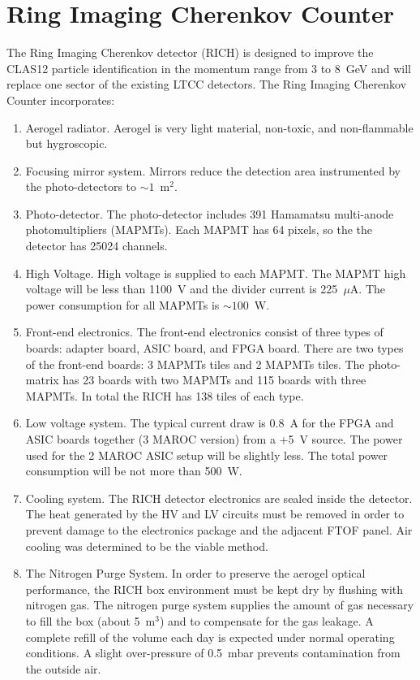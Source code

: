 \section{Ring Imaging Cherenkov Counter}

The Ring Imaging Cherenkov detector (RICH) is designed to improve the CLAS12 particle 
identification in the momentum range from 3 to 8~GeV and will replace one sector of the 
existing LTCC detectors. The Ring Imaging Cherenkov Counter incorporates:

\begin{enumerate}
\item Aerogel radiator. Aerogel is very light material, non-toxic, and non-flammable but 
hygroscopic.

\item Focusing mirror system. Mirrors reduce the detection area instrumented by the 
photo-detectors to $\sim 1$~m$^2$.

\item Photo-detector. The photo-detector includes 391 Hamamatsu multi-anode photomultipliers 
(MAPMTs). Each MAPMT has 64 pixels, so the the detector has 25024 channels.

\item High Voltage. High voltage is supplied to each MAPMT. The MAPMT high voltage will be less 
than 1100~V and the divider current is 225~$\mu$A. The power consumption for all MAPMTs is 
$\sim 100$~W.

\item Front-end electronics. The front-end electronics consist of three types of boards: adapter 
board, ASIC board, and FPGA board.  There are two types of the front-end boards: 3 MAPMTs tiles 
and 2 MAPMTs tiles. The photo-matrix has 23 boards with two MAPMTs and 115 boards with three MAPMTs. 
In total the RICH has 138 tiles of each type.

\item Low voltage system. The typical current draw is 0.8~A for the FPGA and ASIC boards together 
(3 MAROC version) from a +5~V source. The power used for the 2 MAROC ASIC setup will be slightly 
less. The total power consumption will be not more than 500~W. 
 
 \item Cooling system. The RICH detector electronics are sealed inside the detector. The heat 
generated by the HV and LV circuits must be removed in order to prevent damage to the electronics 
package and the adjacent FTOF panel. Air cooling was determined to be the viable method.

\item The Nitrogen Purge System. In order to preserve the aerogel optical performance, the RICH 
box environment must be kept dry by flushing with nitrogen gas. The nitrogen purge system supplies 
the amount of gas necessary to fill the box (about 5~m$^3$) and to compensate for the gas leakage.
A complete refill of the volume each day is expected under normal operating conditions. A slight 
over-pressure of 0.5~mbar prevents contamination from the outside air.

\end{enumerate}

